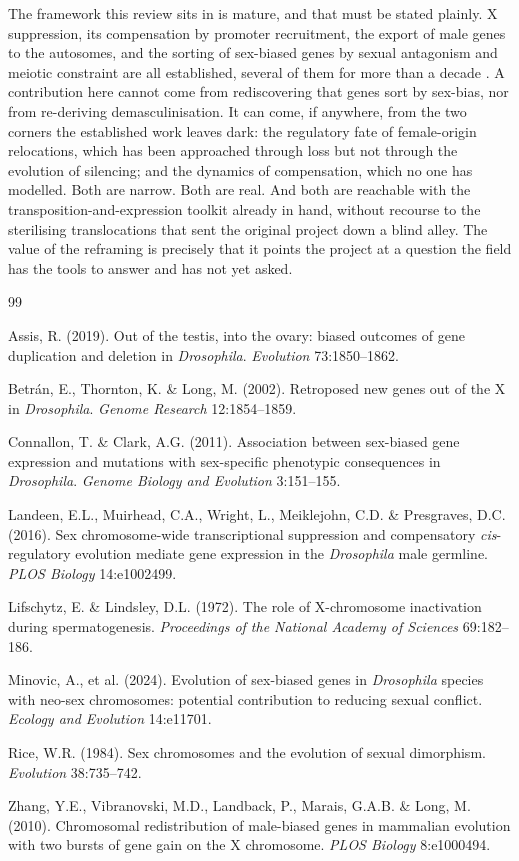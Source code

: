 \documentclass[11pt,a4paper]{article}
\begin{document}
The framework this review sits in is mature, and that must be stated plainly. X suppression, its compensation by promoter recruitment, the export of male genes to the autosomes, and the sorting of sex-biased genes by sexual antagonism and meiotic constraint are all established, several of them for more than a decade \citep{landeen2016,zhang2010,rice1984,betran2002}. A contribution here cannot come from rediscovering that genes sort by sex-bias, nor from re-deriving demasculinisation. It can come, if anywhere, from the two corners the established work leaves dark: the regulatory fate of female-origin relocations, which has been approached through loss but not through the evolution of silencing; and the dynamics of compensation, which no one has modelled. Both are narrow. Both are real. And both are reachable with the transposition-and-expression toolkit already in hand, without recourse to the sterilising translocations that sent the original project down a blind alley. The value of the reframing is precisely that it points the project at a question the field has the tools to answer and has not yet asked.

\begin{thebibliography}{99}

 Assis, R. (2019). Out of the testis, into the ovary: biased outcomes of gene duplication and deletion in \emph{Drosophila}. \emph{Evolution} 73:1850--1862.

 Betr\'an, E., Thornton, K. \& Long, M. (2002). Retroposed new genes out of the X in \emph{Drosophila}. \emph{Genome Research} 12:1854--1859.

 Connallon, T. \& Clark, A.G. (2011). Association between sex-biased gene expression and mutations with sex-specific phenotypic consequences in \emph{Drosophila}. \emph{Genome Biology and Evolution} 3:151--155.

 Landeen, E.L., Muirhead, C.A., Wright, L., Meiklejohn, C.D. \& Presgraves, D.C. (2016). Sex chromosome-wide transcriptional suppression and compensatory \emph{cis}-regulatory evolution mediate gene expression in the \emph{Drosophila} male germline. \emph{PLOS Biology} 14:e1002499.

 Lifschytz, E. \& Lindsley, D.L. (1972). The role of X-chromosome inactivation during spermatogenesis. \emph{Proceedings of the National Academy of Sciences} 69:182--186.

 Minovic, A., et al. (2024). Evolution of sex-biased genes in \emph{Drosophila} species with neo-sex chromosomes: potential contribution to reducing sexual conflict. \emph{Ecology and Evolution} 14:e11701.

 Rice, W.R. (1984). Sex chromosomes and the evolution of sexual dimorphism. \emph{Evolution} 38:735--742.

 Zhang, Y.E., Vibranovski, M.D., Landback, P., Marais, G.A.B. \& Long, M. (2010). Chromosomal redistribution of male-biased genes in mammalian evolution with two bursts of gene gain on the X chromosome. \emph{PLOS Biology} 8:e1000494.

\end{thebibliography}
\end{document}

